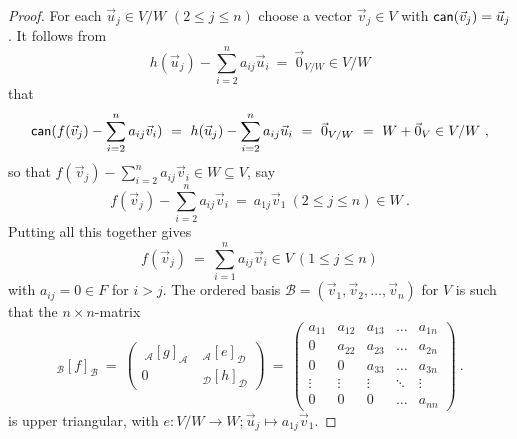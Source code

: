 \documentclass[11pt]{amsbook}
\theoremstyle{definition}
\begin{document}
\begin{proof}
For each $\vec{u}_j \in V/W$ $(2 \leqslant j \leqslant n)$ choose a vector
$\vec{v}_j \in V$ with ${\sf can}(\vec{v}_j)=\vec{u}_j$. It follows from
$$h(\vec{u}_j)-\sum\limits^n_{i=2}a_{ij}\vec{u}_i ~=~\vec{0}_{V/W} \in V/W$$
that
$${\sf can}(f(\vec{v}_j)-\sum\limits^n_{i=2}a_{ij}\vec{v}_i)~=~h(\vec{u}_j)-\sum\limits^n_{i=2}a_{ij}\vec{u}_i
~=~\vec{0}_{V/W}~=~W+\vec{0}_V \in V/W~,$$
so that $f(\vec{v}_j)-\sum\limits^n_{i=2}a_{ij}\vec{v}_i \in W \subseteq V$, say
$$f(\vec{v}_j)-\sum\limits^n_{i=2}a_{ij}\vec{v}_i~=~a_{1j} \vec{v}_1~(2 \leqslant j \leqslant n) \in W~.$$
Putting all this together gives
$$f(\vec{v}_j)~=~\sum\limits^n_{i=1}a_{ij}\vec{v}_i \in V~(1 \leqslant j \leqslant n)$$
with $a_{ij}=0 \in F$ for $i>j$. The ordered  basis ${\mathcal B}=(\vec{v}_1,\vec{v}_2,\dots,\vec{v}_n)$ for $V$ is such that the $n \times n$-matrix
$$_{\mathcal B}[f]_{\mathcal B}~=~\begin{pmatrix}
~_{\mathcal A}[g]_{\mathcal A}&~_{\mathcal A}[e]_{\mathcal D}\\
0 &~_{\mathcal D}[h]_{\mathcal D}\end{pmatrix}~=~
\begin{pmatrix} a_{11} & a_{12} & a_{13} & \dots & a_{1n}\\
0 & a_{22} & a_{23} & \dots & a_{2n}\\
0 & 0 & a_{33} & \dots & a_{3n}\\
\vdots & \vdots & \vdots & \ddots & \vdots \\
0 & 0 & 0 &  \dots & a_{nn} \end{pmatrix}~.
$$
is upper triangular, with $e:V/W \to W;\vec{u}_j \mapsto a_{1j}\vec{v}_1$.
\end{proof}
\end{document}
